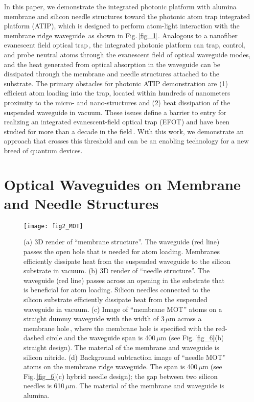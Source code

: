\documentclass{osa-article}
\begin{document}
In this paper, we demonstrate the integrated photonic platform with alumina membrane and silicon needle structures toward the photonic atom trap integrated platform (ATIP), which is designed to perform atom-light interaction with the membrane ridge waveguide\,\cite{Ayi-Yovo20} as shown in Fig.\,\ref{fig_1}. Analogous to a nanofiber evanescent field optical trap\,\cite{RB10, Lee15, Polzik17, Aoki19}, the integrated photonic platform can trap, control, and probe neutral atoms through the evanescent field of optical waveguide modes, and the heat generated from optical absorption in the waveguide can be dissipated through the membrane and needle structures attached to the substrate. The primary obstacles for photonic ATIP demonstration are (1) efficient atom loading into the trap, located within hundreds of nanometers proximity to the micro- and nano-structures and (2) heat dissipation of the suspended waveguide in vacuum. These issues define a barrier to entry for realizing an integrated evanescent-field optical trap (EFOT) and have been studied for more than a decade in the field\,\cite{Lee20, Jau17, Rolston15, Stievater16, Black18, Kimble20}. With this work, we demonstrate an approach that crosses this threshold and can be an enabling technology for a new breed of quantum devices. 

\section{Optical Waveguides on Membrane and Needle Structures}

\begin{figure}[b!]
\centering\texttt{[image: fig2\_MOT]}
\caption{(a) 3D render of ``membrane structure''. The waveguide (red line) passes the open hole that is needed for atom loading. Membranes efficiently dissipate heat from the suspended waveguide to the silicon substrate in vacuum. (b) 3D render of ``needle structure''.  The waveguide (red line) passes across an opening in the substrate that is beneficial for atom loading. Silicon needles connected to the silicon substrate efficiently dissipate heat from the suspended waveguide in vacuum. (c) Image of ``membrane MOT'' atoms on a straight dummy waveguide with the width of 3\,$\mu$m across a membrane hole\,\cite{Lee20}, where the membrane hole is specified with the red-dashed circle and the waveguide span is 400\,$\mu$m  (see Fig.\,\ref{fig_6}(b) straight design). The material of the membrane and waveguide is silicon nitride. (d) Background subtraction image of ``needle MOT'' atoms on the membrane ridge waveguide. The span is 400\,$\mu$m (see Fig.\,\ref{fig_6}(c) hybrid needle design); the gap between two silicon needles is 610\,$\mu$m. The material of the membrane and waveguide is alumina.}
\label{fig_2}
\end{figure}
\end{document}
